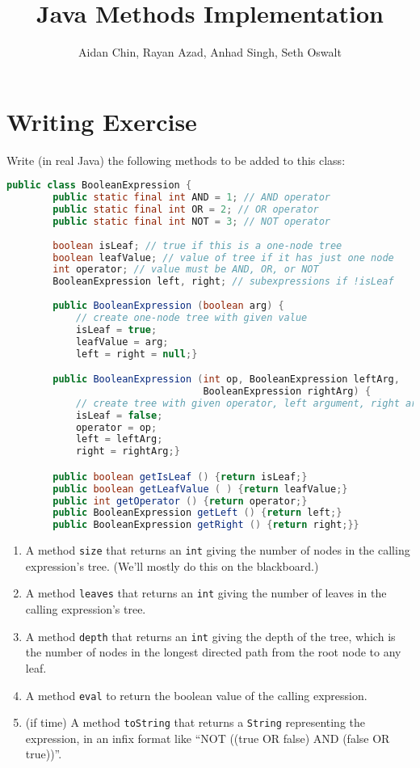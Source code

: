 \documentclass{article}
\begin{document}
\title{Java Methods Implementation}
\author{Aidan Chin, Rayan Azad, Anhad Singh, Seth Oswalt}
\maketitle

\section*{Writing Exercise}

Write (in real Java) the following methods to be added to this class:
\begin{lstlisting}[language=Java]
    public class BooleanExpression {
        public static final int AND = 1; // AND operator
        public static final int OR = 2; // OR operator
        public static final int NOT = 3; // NOT operator
        
        boolean isLeaf; // true if this is a one-node tree
        boolean leafValue; // value of tree if it has just one node
        int operator; // value must be AND, OR, or NOT
        BooleanExpression left, right; // subexpressions if !isLeaf
        
        public BooleanExpression (boolean arg) {
            // create one-node tree with given value
            isLeaf = true;
            leafValue = arg;
            left = right = null;}

        public BooleanExpression (int op, BooleanExpression leftArg, 
                                  BooleanExpression rightArg) {
            // create tree with given operator, left argument, right argument
            isLeaf = false;
            operator = op;
            left = leftArg;
            right = rightArg;}

        public boolean getIsLeaf () {return isLeaf;}
        public boolean getLeafValue ( ) {return leafValue;}
        public int getOperator () {return operator;}
        public BooleanExpression getLeft () {return left;}
        public BooleanExpression getRight () {return right;}}
\end{lstlisting}

\begin{enumerate}
    \item A method \texttt{size} that returns an \texttt{int} giving the number of nodes in the calling expression’s tree. (We’ll mostly do this on the blackboard.)
    \item A method \texttt{leaves} that returns an \texttt{int} giving the number of leaves in the calling expression’s tree.
    \item A method \texttt{depth} that returns an \texttt{int} giving the depth of the tree, which is the number of nodes in the longest directed path from the root node to any leaf.
    \item A method \texttt{eval} to return the boolean value of the calling expression.
    \item (if time) A method \texttt{toString} that returns a \texttt{String} representing the expression, in an infix format like “NOT ((true OR false) AND (false OR true))”.
\end{enumerate}
\end{document}
